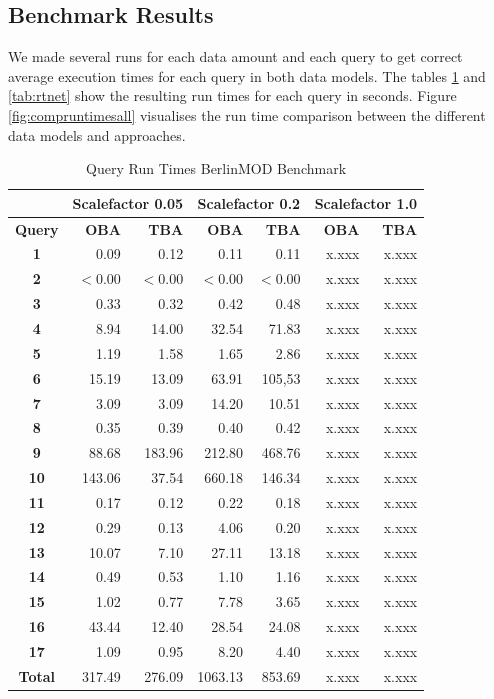 \documentclass[a4paper]{article}
\newcommand{\bmodb} {BerlinMOD Benchmark}
\begin{document}
\subsection{Benchmark Results}
\label{sec:results}
We made several runs for each data amount and each query to get correct average execution times for each query in both data models. The tables \ref{tab:rtbmodb} and \ref{tab:rtnet} show the resulting run times for each query in seconds. Figure \ref{fig:compruntimesall} visualises the run time comparison between the different data models and approaches.
\begin{table}
\begin{scriptsize}
\begin{center}
\begin{tabular}{|c|r|r|r|r|r|r|}
\hline
&\multicolumn{2}{c|}{\textbf{Scalefactor 0.05}}&\multicolumn{2}{c|}{\textbf{Scalefactor 0.2}}&\multicolumn{2}{c|}{\textbf{Scalefactor 1.0}}\\
\hline
\textbf{Query}&\textbf{OBA}&\textbf{TBA}&\textbf{OBA}&\textbf{TBA}&\textbf{OBA}&\textbf{TBA}\\
\hline
\textbf{1}&0.09&0.12&0.11&0.11&x.xxx&x.xxx\\
\hline
\textbf{2}&$<$0.00&$<$0.00&$<$0.00&$<$0.00&x.xxx&x.xxx\\
\hline
\textbf{3}&0.33&0.32&0.42&0.48&x.xxx&x.xxx\\
\hline
\textbf{4}&8.94&14.00&32.54&71.83&x.xxx&x.xxx\\
\hline
\textbf{5}&1.19&1.58&1.65&2.86&x.xxx&x.xxx\\
\hline
\textbf{6}&15.19&13.09&63.91&105,53&x.xxx&x.xxx\\
\hline
\textbf{7}&3.09&3.09&14.20&10.51&x.xxx&x.xxx\\
\hline
\textbf{8}&0.35&0.39&0.40&0.42&x.xxx&x.xxx\\
\hline
\textbf{9}&88.68&183.96&212.80&468.76&x.xxx&x.xxx\\
\hline
\textbf{10}&143.06&37.54&660.18&146.34&x.xxx&x.xxx\\
\hline
\textbf{11}&0.17&0.12&0.22&0.18&x.xxx&x.xxx\\
\hline
\textbf{12}&0.29&0.13&4.06&0.20&x.xxx&x.xxx\\
\hline
\textbf{13}&10.07&7.10&27.11&13.18&x.xxx&x.xxx\\
\hline
\textbf{14}&0.49&0.53&1.10&1.16&x.xxx&x.xxx\\
\hline
\textbf{15}&1.02&0.77&7.78&3.65&x.xxx&x.xxx\\
\hline
\textbf{16}&43.44&12.40&28.54&24.08&x.xxx&x.xxx\\
\hline
\textbf{17}&1.09&0.95&8.20&4.40&x.xxx&x.xxx\\
\hline
\textbf{Total}&317.49&276.09&1063.13&853.69&x.xxx&x.xxx\\
\hline
\end{tabular}
\end{center}
\end{scriptsize}
\caption{Query Run Times \bmodb{}}
\label{tab:rtbmodb}
\end{table}
\end{document}
